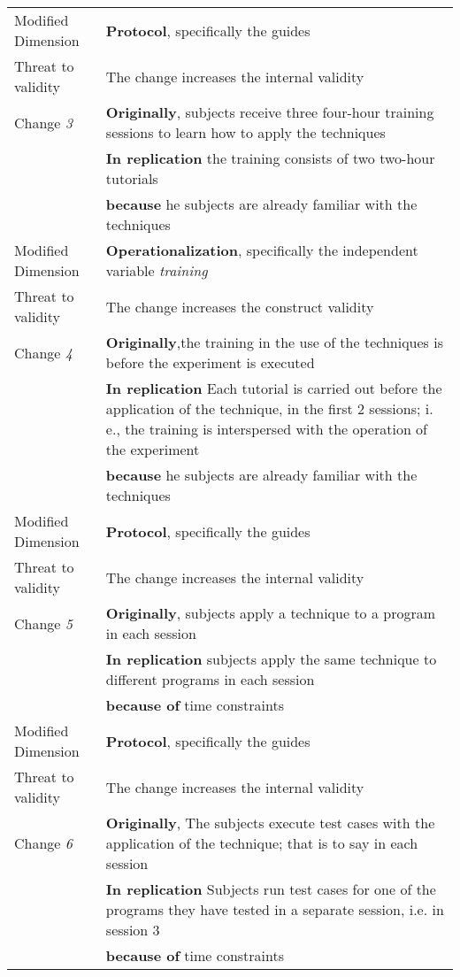\begin{table*}[h]
\begin{tabularx}{\textwidth}{
  >{\hsize=0.3\hsize}X
  >{\hsize=0.8\hsize}X}
    
    Modified Dimension & 
   \textbf{Protocol}, specifically the guides  \\ 
    Threat to validity & The change increases the internal validity \\  \hline
    
    Change \textit{3}   & \textbf{Originally}, subjects receive three four-hour training sessions to learn how to apply the techniques   \\& \textbf{In replication} the training consists of two two-hour tutorials \\& \textbf{because} he subjects are already familiar with the techniques \\ 

    Modified Dimension & 
   \textbf{Operationalization}, specifically the independent variable  \textit {training} \\ 
    Threat to validity & The change increases the construct validity \\ \hline
    
    Change \textit{4}   & \textbf{Originally},the training in the use of the techniques is before the experiment is executed \\& \textbf{In replication} Each tutorial is carried out before the application of the technique, in the first 2 sessions; i. e., the training is interspersed with the operation of the experiment \\& \textbf{because} he subjects are already familiar with the techniques \\  

    Modified Dimension & 
   \textbf{Protocol}, specifically the guides   \\
     Threat to validity & The change increases the internal validity  \\ 
    \hline
    Change \textit{5}   & \textbf{Originally}, subjects apply a technique to a program in each session \\& \textbf{In replication} subjects apply the same technique to different programs in each session \\& \textbf{because of} time constraints \\

    Modified Dimension & 
   \textbf{Protocol}, specifically the guides  \\ 
    Threat to validity & The change increases the internal validity \\  \hline
    
    Change \textit{6}   & \textbf{Originally}, The subjects execute test cases with the application of the technique; that is to say in each session \\& \textbf{In replication} Subjects run test cases for one of the programs they have tested in a separate session, i.e. in session 3 \\& \textbf{because of} time constraints \\ 


\end{tabularx}
\end{table*}
